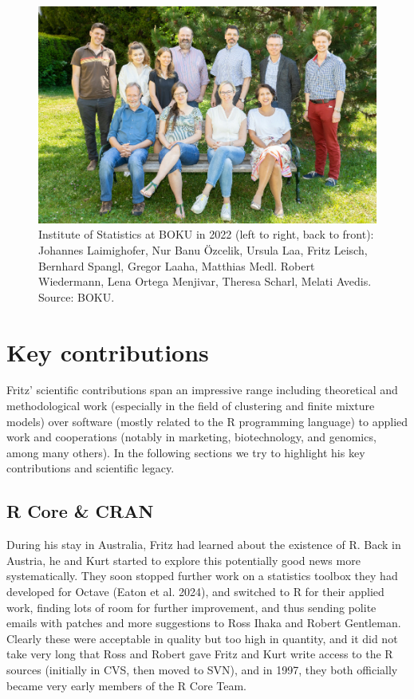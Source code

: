 \begin{figure}[t!]

{\centering \includegraphics[width=0.83\linewidth]{fritz_files/figure-latex/boku-1} 

}

\caption{Institute of Statistics at BOKU in 2022 (left to right, back to front): Johannes Laimighofer, Nur Banu Özcelik, Ursula Laa, Fritz Leisch, Bernhard Spangl, Gregor Laaha, Matthias Medl. Robert Wiedermann, Lena Ortega Menjivar, Theresa Scharl, Melati Avedis. Source: BOKU.}\label{fig:boku}
\end{figure}

\hypertarget{key-contributions}{%
\section{Key contributions}\label{key-contributions}}

Fritz' scientific contributions span an impressive range including
theoretical and methodological work (especially in the field of clustering
and finite mixture models) over software (mostly related to the R
programming language) to applied work and cooperations (notably in
marketing, biotechnology, and genomics, among many others). In the
following sections we try to highlight his key contributions and
scientific legacy.

\hypertarget{r-core-cran}{%
\subsection{R Core \& CRAN}\label{r-core-cran}}

During his stay in Australia, Fritz had learned about the existence of
R. Back in Austria, he and Kurt started to explore this potentially
good news more systematically. They soon stopped further work on a
statistics toolbox they had developed for Octave (Eaton et al. 2024),
and switched to R for their applied work, finding lots of room for
further improvement, and thus sending polite emails with patches and
more suggestions to Ross Ihaka and Robert Gentleman. Clearly these were
acceptable in quality but too high in quantity, and it did not take very
long that Ross and Robert gave Fritz and Kurt write access to the R
sources (initially in CVS, then moved to SVN), and in 1997, they both
officially became very early members of the R Core Team.


